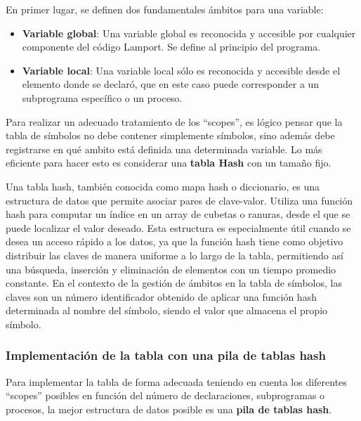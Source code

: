\vspace{0.5cm}

\noindent
En primer lugar, se definen dos fundamentales ámbitos para una variable:
\begin{itemize}
    \item \textbf{Variable global}: Una variable global es reconocida y accesible por cualquier componente del código Lamport. Se define al principio del programa.
    \item \textbf{Variable local}: Una variable local sólo es reconocida y accesible desde el elemento donde se declaró, que en este caso puede corresponder a un subprograma específico o un proceso.
\end{itemize}

Para realizar un adecuado tratamiento de los ``scopes'', es lógico pensar que la tabla de símbolos no debe contener simplemente símbolos, sino además debe registrarse en qué ambito está definida una determinada variable. Lo más eficiente para hacer esto es considerar una \textbf{tabla Hash} con un tamaño fijo. 

\vspace{0.5cm}
Una tabla hash, también conocida como mapa hash o diccionario, es una estructura de datos que permite asociar pares de clave-valor. Utiliza una función hash para computar un índice en un array de cubetas o ranuras, desde el que se puede localizar el valor deseado. Esta estructura es especialmente útil cuando se desea un acceso rápido a los datos, ya que la función hash tiene como objetivo distribuir las claves de manera uniforme a lo largo de la tabla, permitiendo así una búsqueda, inserción y eliminación de elementos con un tiempo promedio constante. En el contexto de la gestión de ámbitos en la tabla de símbolos, las claves son un número identificador obtenido de aplicar una función hash determinada al nombre del símbolo, siendo el valor que almacena el propio símbolo.

\subsubsection{Implementación de la tabla con una pila de tablas hash}
Para implementar la tabla de forma adecuada teniendo en cuenta los diferentes ``scopes'' posibles en función del número de declaraciones, subprogramas o procesos, la mejor estructura de datos posible es una \textbf{pila de tablas hash}.

\vspace{0.5cm}

